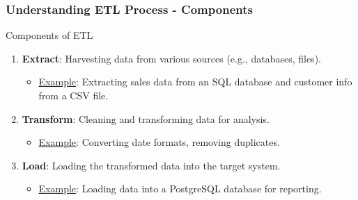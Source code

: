\documentclass[aspectratio=169]{beamer}
\begin{document}
\begin{frame}[fragile]
    \frametitle{Understanding ETL Process - Components}
    \begin{block}{Components of ETL}
        \begin{enumerate}
            \item \textbf{Extract}: Harvesting data from various sources (e.g., databases, files).
                \begin{itemize}
                    \item \underline{Example}: Extracting sales data from an SQL database and customer info from a CSV file.
                \end{itemize}
            \item \textbf{Transform}: Cleaning and transforming data for analysis.
                \begin{itemize}
                    \item \underline{Example}: Converting date formats, removing duplicates.
                \end{itemize}
            \item \textbf{Load}: Loading the transformed data into the target system.
                \begin{itemize}
                    \item \underline{Example}: Loading data into a PostgreSQL database for reporting.
                \end{itemize}
        \end{enumerate}
    \end{block}
\end{frame}
\end{document}
